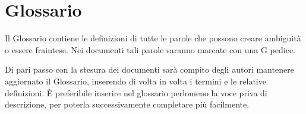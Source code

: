 \section{Glossario}

Il Glossario contiene le definizioni di tutte le parole che possono creare ambiguità o essere fraintese. Nei documenti tali parole saranno marcate con una G pedice.

Di pari passo con la stesura dei documenti sarà compito degli autori mantenere aggiornato il Glossario, inserendo di volta in volta i termini e le relative definizioni. È preferibile inserire nel glossario perlomeno la voce priva di descrizione, per poterla successivamente completare più facilmente.
